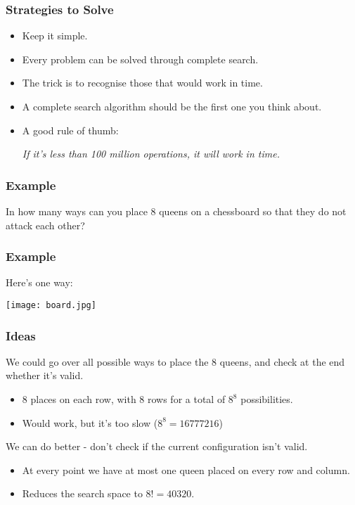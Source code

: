 \documentclass{beamer}
\begin{document}
\begin{frame}
    \frametitle{Strategies to Solve}
    \begin{itemize}
            \pause
        \item Keep it simple.
            \pause
        \item Every problem can be solved through complete search.
            \pause
        \item The trick is to recognise those that would work in time.
            \pause
        \item A complete search algorithm should be the first one you think about.
            \pause
        \item A good rule of thumb:

            \pause
        \vspace{5mm}
        \emph{If it's less than 100 million operations, it will work in time.}
    \end{itemize}
\end{frame}

\begin{frame}
    \frametitle{Example}
    \Large In how many ways can you place 8 queens on a chessboard so that they do not attack each other?

\end{frame}

\begin{frame}
    \frametitle{Example}
    Here's one way:

    \begin{center}
        \texttt{[image: board.jpg]}
    \end{center}
\end{frame}

\begin{frame}
    \frametitle{Ideas}

    We could go over all possible ways to place the 8 queens, and check at the end whether it's valid.
    
    \begin{itemize}
            \pause
        \item 8 places on each row, with 8 rows for a total of $8^8$ possibilities.
            \pause
        \item Would work, but it's too slow ($8^8 = 16777216$)
            \pause
    \end{itemize}
        
    \pause
    We can do better \pause - don't check if the current configuration isn't valid.

    \begin{itemize}
            \pause
        \item At every point we have at most one queen placed on every row and column.
            \pause
        \item Reduces the search space to $8! = 40320$.
    \end{itemize}
\end{frame}
\end{document}
